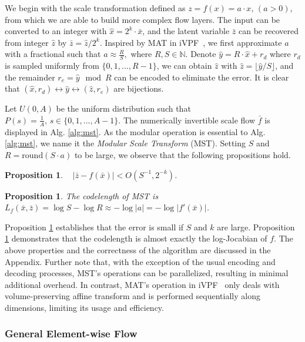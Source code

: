 \documentclass{article}
\newcommand{\quant}[1]{\bar{#1}}
\newtheorem{proposition}[theorem]{Proposition}
\begin{document}
We begin with the scale transformation defined as $z = f(x) = a \cdot x, \,  (a > 0)$, from which we are able to build more complex flow layers.
The input can be converted to an integer with $\hat{x} = 2^k \cdot \quant{x}$, and the latent variable $\quant{z}$ can be recovered from integer $\hat{z}$ by $\quant{z} = \hat{z} / 2^k$. Inspired by MAT in iVPF~\cite{zhang2021ivpf}, we first approximate $a$ with a fractional such that $a \approx \frac{R}{S},$ where $ R, S \in \mathbb{N}$. Denote $\hat{y} = R \cdot \hat{x} + r_{d}$ where $r_{d}$ is sampled uniformly from $\{0,1,...,R-1\}$, we can obtain $\hat{z}$ with $\hat{z} = \lfloor 
\hat{y}/S \rfloor$, and the remainder $r_e = \hat{y} \mod R$ can be encoded to eliminate the error. It is clear that $(\hat{x}, r_d) \leftrightarrow \hat{y} \leftrightarrow (\hat{z}, r_e)$ are bijections.

Let $U(0, A)$ be the uniform distribution such that $P(s) = \frac{1}{A}, \, s \in \{0,1,...,A-1\}$. The numerically invertible scale flow $\bar{f}$ is displayed in Alg. \ref{alg:mst}. As the modular operation is essential to Alg. \ref{alg:mst}, we name it the \textit{Modular Scale Transform} (MST). Setting $S$ and $R = \mathrm{round}(S \cdot a)$ to be large, we observe that the following propositions hold.
\begin{proposition}
\label{the:mst1}
~\cite{zhang2021ivpf} $|\bar{z} - f(\bar{x})| < O(S^{-1}, 2^{-k})$.
\end{proposition}
\begin{proposition}
The codelength of MST is $L_f(\bar{x}, \bar{z}) = \log S - \log R \approx -\log |a| = - \log |f'(\bar{x})|$.
\label{the:mst2}
\end{proposition}

Proposition \ref{the:mst1} establishes that the error is small if $S$ and $k$ are large. Proposition \ref{the:mst2} demonstrates that the codelength is almost exactly the log-Jocabian of $f$.
The above properties and the correctness of the algorithm are discussed in the Appendix. 
Further note that, with the exception of the usual encoding and decoding processes, MST's operations can be parallelized, resulting in minimal additional overhead. In contrast, MAT's operation in iVPF~\cite{zhang2021ivpf} only deals with volume-preserving affine transform and is performed sequentially along dimensions, limiting its usage and efficiency.




\subsubsection{General Element-wise Flow}
\end{document}

